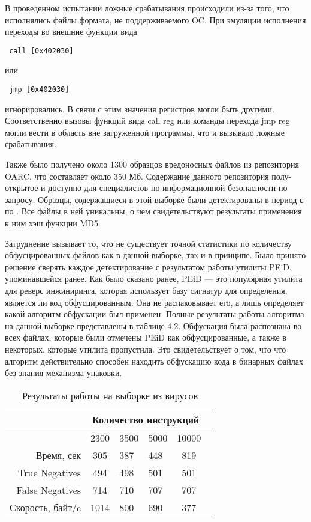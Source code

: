 \documentclass[oneside, final, 14pt]{extreport}
\begin{document}
В проведенном испытании ложные срабатывания происходили из-за того, что исполнялись файлы формата, не поддерживаемого OC. При эмуляции исполнения переходы во внешние функции вида \begin{verbatim} call [0x402030] \end{verbatim} или \begin{verbatim} jmp [0x402030]\end{verbatim} игнорировались. В связи с этим значения регистров могли быть другими. Соответственно вызовы функций вида call reg или команды перехода jmp reg могли вести в область вне загруженной программы, что и вызывало ложные срабатывания. 

Также было получено около 1300 образцов вредоносных файлов из репозитория OARC, что составляет около 350 Мб. Содержание данного репозитория полу-открытое и доступно для специалистов по информационной безопасности по запросу. Образцы, содержащиеся в этой выборке были детектированы в период с  по  . Все файлы в ней уникальны, о чем свидетельствуют результаты применения к ним хэш функции MD5. 

Затруднение вызывает то, что не существует точной статистики по количеству обфусцированных файлов как в данной выборке, так и в принципе. Было принято решение сверять каждое детектирование с результатом работы утилиты PEiD, упоминавшейся ранее. Как было сказано ранее, PEiD — это популярная утилита для реверс инжиниринга, которая использует базу сигнатур для определения, является ли код обфусцированным. Она не распаковывает его, а лишь определяет какой алгоритм обфускации был применен.  Полные результаты работы алгоритма на данной выборке представлены в таблице 4.2. Обфускация была распознана во всех файлах, которые были отмечены PEiD как обфусцированные, а также в некоторых, которые утилита пропустила. Это свидетельствует о том, что что алгоритм действительно способен находить обфускацию кода в бинарных файлах без знания механизма упаковки. 

\begin{table}[t]
\begin{tabular}{|r|c|p{}|p{}|c|r}
\hline & \multicolumn {4}{c|}{Количество инструкций}\\
\hline & 2300 & 3500 &5000 & 10000\\
\hline Время, сек & 305 & 387 & 448 & 819\\
\hline True  Negatives & 494 & 498 & 501 & 501\\ 
\hline False Negatives & 714 & 710 & 707 & 707\\ 
\hline Скорость, байт/c & 1014 & 800 & 690 & 377 \\ \hline
\end{tabular}
\caption{Результаты работы на выборке из вирусов}
\end{table}
  
\end{document}
